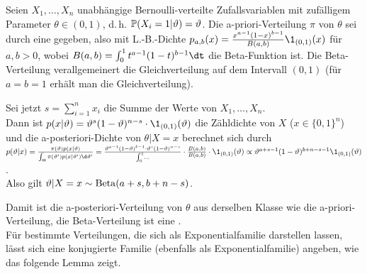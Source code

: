 \linie
\pagebreak

\begin{Bsp}
    Seien $X_1, \dotsc, X_n$ unabhängige Bernoulli-verteilte Zufallsvariablen mit
    zufälligem Parameter $\theta \in (0, 1)$, d.\,h.
    $\mathbb{P}(X_i = 1|\vartheta) = \vartheta$.
    Die a-priori-Verteilung $\pi$ von $\theta$ sei durch eine  gegeben,
    also mit L.-B.-Dichte $p_{a,b}(x) = \frac{x^{a-1} (1-x)^{b-1}}{B(a, b)} \1_{(0,1)}(x)$
    für $a, b > 0$,
    wobei $B(a, b) = \int_0^1 t^{a-1} (1-t)^{b-1} \dt$ die Beta-Funktion ist.
    Die Beta-Verteilung verallgemeinert die Gleichverteilung auf dem Intervall $(0, 1)$
    (für $a = b = 1$ erhält man die Gleichverteilung).

    Sei jetzt $s = \sum_{i=1}^n x_i$ die Summe der Werte von $X_1, \dotsc, X_n$.\\
    Dann ist $p(x|\theta) = \theta^s (1 - \theta)^{n-s} \cdot \1_{(0, 1)}(\theta)$
    die Zähldichte von $X$ ($x \in \{0, 1\}^n$) und die a-posteriori-Dichte von $\theta|X = x$
    berechnet sich durch\\
    $p(\theta|x) = \frac{\pi(\theta) p(x|\theta)}{\int_\Theta \pi(\theta') p(x|\theta') \d\theta'}
    = \frac{\theta^{a-1} (1 - \theta)^{b-1} \cdot \theta^s (1 - \theta)^{n-s}}{\int_0^1 \dots}
    \cdot \frac{B(a, b)}{B(a, b)} \cdot \1_{(0, 1)}(\theta)
    \propto \theta^{a+s-1} (1 - \theta)^{b+n-s-1} \1_{(0,1)}(\theta)$.\\
    Also gilt $\vartheta|X = x \sim \operatorname{Beta}(a + s, b + n - s)$.
\end{Bsp}

\begin{Bem}
    Damit ist die a-posteriori-Verteilung von $\theta$ aus derselben Klasse wie die
    a-priori-Verteilung, die Beta-Verteilung ist eine
    .\\
    Für bestimmte Verteilungen, die sich als Exponentialfamilie
    darstellen lassen, lässt sich eine konjugierte Familie
    (ebenfalls als Exponentialfamilie) angeben,
    wie das folgende Lemma zeigt.
\end{Bem}

\linie

